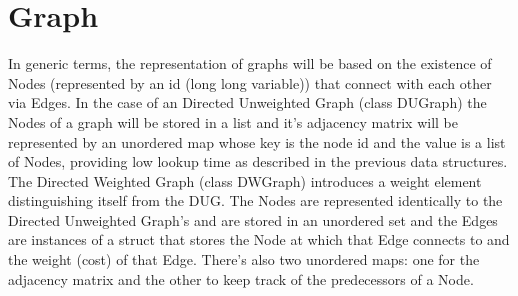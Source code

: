 \section{Graph}
In generic terms, the representation of graphs will be based on the existence of Nodes (represented by an id (long long variable)) that connect with each other via Edges.
In the case of an Directed Unweighted Graph (class DUGraph) the Nodes of a graph will be stored in a list and it's adjacency matrix will be represented by an unordered map whose key is the node id and the value is a list of Nodes, providing low lookup time as described in the previous data structures.
The Directed Weighted Graph (class DWGraph) introduces a weight element distinguishing itself
from the DUG. The Nodes are represented identically to the Directed Unweighted Graph's and are stored in an unordered set and the Edges are instances of a struct that stores the Node at which that Edge connects to and the weight (cost) of that Edge. There's also two unordered maps: one for the adjacency matrix and the other to keep track of the predecessors of a Node.
